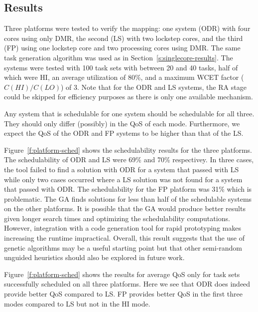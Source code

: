 \subsection{Results}


	Three platforms were tested to verify the mapping: one system (ODR) with four cores using only DMR, the second (LS) with two lockstep cores, and the third (FP) using one lockstep core and two processing cores using DMR. 
	The same task generation algorithm was used as in Section~\ref{s:singlecore-results}. 
	The systems were tested with 100 task sets with between 20 and 40 tasks, half of which were HI, an average utilization of 80\%, and a maximum WCET factor ($C(HI)/C(LO)$) of 3. 
	Note that for the ODR and LS systems, the RA stage could be skipped for efficiency purposes as there is only one available mechanism.

	Any system that is schedulable for one system should be schedulable for all three. 
	They should only differ (possibly) in the QoS of each mode. 
	Furthermore, we expect the QoS of the ODR and FP systems to be higher than that of the LS.  

	Figure~\ref{f:platform-sched} shows the schedulability results for the three platforms. 
	The schedulability of ODR and LS were 69\% and 70\% respectivey. 
	In three cases, the tool failed to find a solution with ODR for a system that passed with LS while only two cases occurred where a LS solution was not found for a system that passed with ODR. 
	The schedulability for the FP platform was 31\% which is problematic. 
	The GA finds solutions for less than half of the schedulable systems on the other platforms.
	It is possible that the GA would produce better results given longer search times and optimizing the schedulability computations. 
	However, integration with a code generation tool for rapid prototyping makes increasing the runtime impractical. 
	Overall, this result suggests that the use of genetic algorithms may be a useful starting point but that other semi-random unguided heuristics should also be explored in future work.
	
	Figure~\ref{f:platform-sched} shows the results for average QoS only for task sets successfully scheduled on all three platforms. 
	Here we see that ODR does indeed provide better QoS compared to LS.
	FP provides better QoS in the first three modes compared to LS but not in the HI mode.
	

